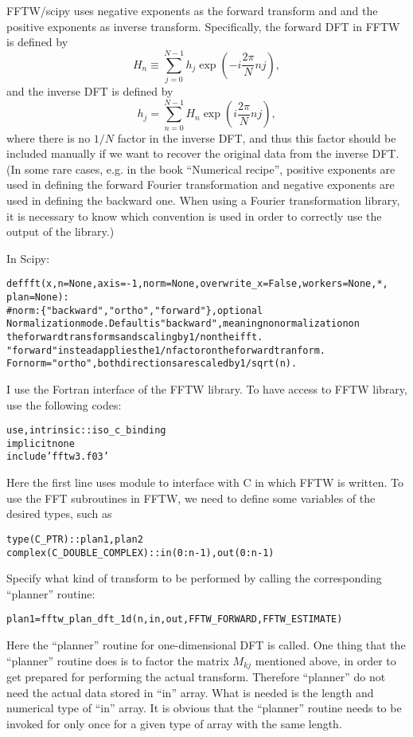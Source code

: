 \documentclass{article}
\newcommand{\codestar}[1]{\text{{\bfseries{#1}}}}
\newenvironment{tmcode}[1][]{\begin{alltt} }{\end{alltt}}
\begin{document}
FFTW/scipy uses negative exponents as the forward transform and and the
positive exponents as inverse transform. Specifically, the forward DFT in FFTW
is defined by
\begin{equation}
  H_n \equiv \sum_{j = 0}^{N - 1} h_j \exp \left( - i \frac{2 \pi}{N} n j
  \right),
\end{equation}
and the inverse DFT is defined by
\begin{equation}
  h_j = \sum_{n = 0}^{N - 1} H_n \exp \left( i \frac{2 \pi}{N} n j \right),
\end{equation}
where there is no $1 / N$ factor in the inverse DFT, and thus this factor
should be included manually if we want to recover the original data from the
inverse DFT. (In some rare cases, e.g. in the book ``Numerical
recipe''{\cite{press1992}}, positive exponents are used in defining the
forward Fourier transformation and negative exponents are used in defining the
backward one. When using a Fourier transformation library, it is necessary to
know which convention is used in order to correctly use the output of the
library.)

In Scipy:
\begin{tmcode}
def fft(x, n=None, axis=-1, norm=None, overwrite_x=False, workers=None, *,
        plan=None):
#norm : \{"backward", "ortho", "forward"\}, optional
        Normalization mode. Default is "backward", meaning no normalization on
        the forward transforms and scaling by 1/n on the ifft.
        "forward" instead applies the 1/n factor on the forward tranform.
        For norm="ortho", both directions are scaled by 1/sqrt(n).
\end{tmcode}
I use the Fortran interface of the FFTW library. To have access to FFTW
library, use the following codes:
\begin{tmcode}
use, intrinsic :: iso_c_binding
implicit none
include 'fftw3.f03'
\end{tmcode}
Here the first line uses {\codestar{iso\_c\_binding}} module to interface with
C in which FFTW is written. To use the FFT subroutines in FFTW, we need to
define some variables of the desired types, such as
\begin{tmcode}
type(C_PTR) :: plan1, plan2
complex(C_DOUBLE_COMPLEX) :: in(0:n-1), out(0:n-1)
\end{tmcode}
Specify what kind of transform to be performed by calling the corresponding
``planner'' routine:
\begin{tmcode}
plan1 = fftw_plan_dft_1d(n, in,out, FFTW_FORWARD,FFTW_ESTIMATE)
\end{tmcode}
Here the ``planner'' routine for one-dimensional DFT is called. One thing that
the ``planner'' routine does is to factor the matrix $M_{k j}$ mentioned
above, in order to get prepared for performing the actual transform. Therefore
``planner'' do not need the actual data stored in ``in'' array. What is needed
is the length and numerical type of ``in'' array. It is obvious that the
``planner'' routine needs to be invoked for only once for a given type of
array with the same length.
\end{document}
